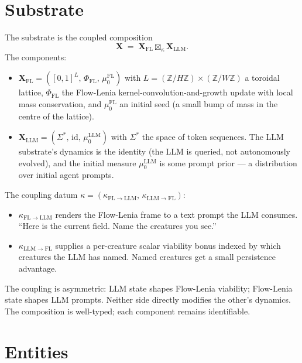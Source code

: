 \section{Substrate}

The substrate is the coupled composition
\[
  \mathbf{X} \;=\; \mathbf{X}_{\mathrm{FL}} \boxtimes_{\kappa}
  \mathbf{X}_{\mathrm{LLM}}.
\]
The components:

\begin{itemize}[leftmargin=1.5em,itemsep=2pt]
  \item $\mathbf{X}_{\mathrm{FL}} = ([0,1]^L,\, \Phi_{\mathrm{FL}},\,
    \mu_0^{\mathrm{FL}})$ with $L = (\mathbb{Z}/H\mathbb{Z}) \times
    (\mathbb{Z}/W\mathbb{Z})$ a toroidal lattice, $\Phi_{\mathrm{FL}}$
    the Flow-Lenia kernel-convolution-and-growth update with local
    mass conservation, and $\mu_0^{\mathrm{FL}}$ an initial seed (a
    small bump of mass in the centre of the lattice).
  \item $\mathbf{X}_{\mathrm{LLM}} = (\Sigma^{*},\, \mathrm{id},\,
    \mu_0^{\mathrm{LLM}})$ with $\Sigma^*$ the space of token
    sequences. The LLM substrate's dynamics is the identity (the LLM
    is queried, not autonomously evolved), and the initial measure
    $\mu_0^{\mathrm{LLM}}$ is some prompt prior --- a distribution
    over initial agent prompts.
\end{itemize}

The coupling datum $\kappa = (\kappa_{\mathrm{FL} \to \mathrm{LLM}},\,
\kappa_{\mathrm{LLM} \to \mathrm{FL}})$:

\begin{itemize}[leftmargin=1.5em,itemsep=2pt]
  \item $\kappa_{\mathrm{FL} \to \mathrm{LLM}}$ renders the Flow-Lenia
    frame to a text prompt the LLM consumes. ``Here is the current
    field. Name the creatures you see.''
  \item $\kappa_{\mathrm{LLM} \to \mathrm{FL}}$ supplies a
    per-creature scalar viability bonus indexed by which creatures the
    LLM has named. Named creatures get a small persistence advantage.
\end{itemize}

The coupling is asymmetric: LLM state shapes Flow-Lenia viability;
Flow-Lenia state shapes LLM prompts. Neither side directly modifies the
other's dynamics. The composition is well-typed; each component
remains identifiable.

\section{Entities}

